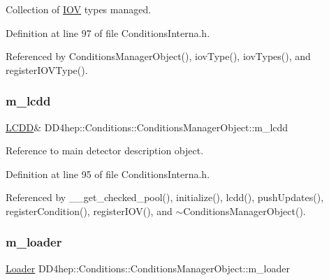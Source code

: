 Collection of \hyperlink{class_d_d4hep_1_1_i_o_v}{I\+OV} types managed. 



Definition at line 97 of file Conditions\+Interna.\+h.



Referenced by Conditions\+Manager\+Object(), iov\+Type(), iov\+Types(), and register\+I\+O\+V\+Type().

\hypertarget{class_d_d4hep_1_1_conditions_1_1_conditions_manager_object_a6ca16a780558379464d37ca9e691e9ef}{}\label{class_d_d4hep_1_1_conditions_1_1_conditions_manager_object_a6ca16a780558379464d37ca9e691e9ef} 
\subsubsection{\texorpdfstring{m\+\_\+lcdd}{m\_lcdd}}
{\footnotesize\ttfamily \hyperlink{class_d_d4hep_1_1_geometry_1_1_l_c_d_d}{L\+C\+DD}\& D\+D4hep\+::\+Conditions\+::\+Conditions\+Manager\+Object\+::m\+\_\+lcdd}



Reference to main detector description object. 



Definition at line 95 of file Conditions\+Interna.\+h.



Referenced by \+\_\+\+\_\+get\+\_\+checked\+\_\+pool(), initialize(), lcdd(), push\+Updates(), register\+Condition(), register\+I\+O\+V(), and $\sim$\+Conditions\+Manager\+Object().

\hypertarget{class_d_d4hep_1_1_conditions_1_1_conditions_manager_object_a94483d902a20171f95eaf0e2d531f05d}{}\label{class_d_d4hep_1_1_conditions_1_1_conditions_manager_object_a94483d902a20171f95eaf0e2d531f05d} 
\subsubsection{\texorpdfstring{m\+\_\+loader}{m\_loader}}
{\footnotesize\ttfamily \hyperlink{class_d_d4hep_1_1_conditions_1_1_conditions_manager_object_ab2df3fc6386b7f71ed3087271d90acc6}{Loader} D\+D4hep\+::\+Conditions\+::\+Conditions\+Manager\+Object\+::m\+\_\+loader}



